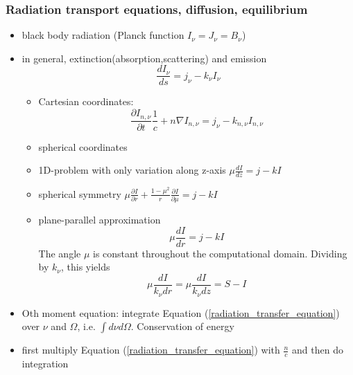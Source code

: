 \documentclass[../main/main.tex]{subfiles}
\begin{document}
\subsubsection{Radiation transport equations, diffusion, equilibrium}
\begin{itemize}
\item black body radiation (Planck function $I_{\nu} = J_{\nu} = B_{\nu}$)
\item in general, extinction(absorption,scattering) and emission
\begin{equation}
\frac{dI_{\nu}}{ds} = j_{\nu} - k_{\nu}I_{\nu}
\end{equation}
\begin{itemize}
\item Cartesian coordinates: 
\begin{equation}
\boxed{\frac{\partial I_{n,\nu}}{\partial t}\frac{1}{c} + n \nabla I_{n,\nu} = j_{\nu} - k_{n,\nu}I_{n,\nu}}
\label{radiation_transfer_equation}
\end{equation}
\item spherical coordinates 
\item 1D-problem with only variation along z-axis $\mu \frac{dI}{dz}  = j -kI$
\item spherical symmetry $\mu \frac{\partial I}{\partial r} + \frac{1-\mu^2}{r}\frac{\partial I}{\partial \mu} = j-kI$
\item plane-parallel approximation 
\begin{equation}
\boxed{\mu \frac{d I}{dr} = j - kI} 
\label{plane_parallel_radiation}
\end{equation}
The angle $\mu$ is constant throughout the computational domain.
Dividing by $k_{\nu}$, this yields 
\begin{equation}
\mu \frac{dI}{k_{\nu} dr} =  \mu \frac{dI}{k_{\nu} dz} = S-I
\end{equation}


\end{itemize}
\item Oth moment equation: integrate Equation (\ref{radiation_transfer_equation}) over $\nu$ and $\Omega$, i.e. $\int d\nu d\Omega$. Conservation of energy
\item first multiply Equation (\ref{radiation_transfer_equation}) with $\frac{n}{c}$ and then do integration
\end{itemize}
\end{document}
